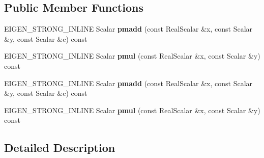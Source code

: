 \subsection*{Public Member Functions}
\begin{DoxyCompactItemize}
\item 
\mbox{\label{struct_eigen_1_1internal_1_1conj__helper_3_01_real_scalar_00_01std_1_1complex_3_01_real_scalar_01_4_00_01false_00_01_conj_01_4_aca574a03a8f7b07ff5be42a46225fede}} 
E\+I\+G\+E\+N\+\_\+\+S\+T\+R\+O\+N\+G\+\_\+\+I\+N\+L\+I\+NE Scalar {\bfseries pmadd} (const Real\+Scalar \&x, const Scalar \&y, const Scalar \&c) const
\item 
\mbox{\label{struct_eigen_1_1internal_1_1conj__helper_3_01_real_scalar_00_01std_1_1complex_3_01_real_scalar_01_4_00_01false_00_01_conj_01_4_ac57d9fcc8f1e5a90dee9a3820ab15872}} 
E\+I\+G\+E\+N\+\_\+\+S\+T\+R\+O\+N\+G\+\_\+\+I\+N\+L\+I\+NE Scalar {\bfseries pmul} (const Real\+Scalar \&x, const Scalar \&y) const
\item 
\mbox{\label{struct_eigen_1_1internal_1_1conj__helper_3_01_real_scalar_00_01std_1_1complex_3_01_real_scalar_01_4_00_01false_00_01_conj_01_4_aca574a03a8f7b07ff5be42a46225fede}} 
E\+I\+G\+E\+N\+\_\+\+S\+T\+R\+O\+N\+G\+\_\+\+I\+N\+L\+I\+NE Scalar {\bfseries pmadd} (const Real\+Scalar \&x, const Scalar \&y, const Scalar \&c) const
\item 
\mbox{\label{struct_eigen_1_1internal_1_1conj__helper_3_01_real_scalar_00_01std_1_1complex_3_01_real_scalar_01_4_00_01false_00_01_conj_01_4_ac57d9fcc8f1e5a90dee9a3820ab15872}} 
E\+I\+G\+E\+N\+\_\+\+S\+T\+R\+O\+N\+G\+\_\+\+I\+N\+L\+I\+NE Scalar {\bfseries pmul} (const Real\+Scalar \&x, const Scalar \&y) const
\end{DoxyCompactItemize}


\subsection{Detailed Description}
